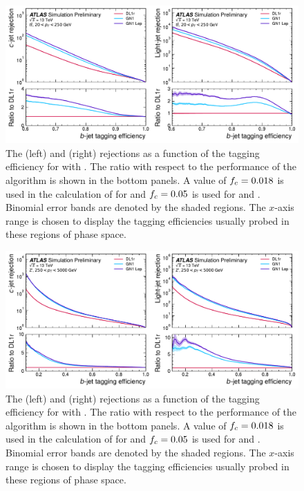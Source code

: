 \begin{figure}[!p]
    \centering
    \includegraphics[width=\textwidth]{chapters/gnn_tagger/figs/results/main/ttbar/ttbar_roc_btag.pdf}
    \caption{The \cjet (left) and \ljet (right) rejections as a function of the \bjet tagging efficiency for \ttbarjets with \ttbarpt \cite{ATL-PHYS-PUB-2022-027}.
             The ratio with respect to the performance of the \DLr algorithm is shown in the bottom panels.
             A value of $f_c = 0.018$ is used in the calculation of \Db for \DLr and $f_c = 0.05$ is used for \GNN and \GNNLep.
             Binomial error bands are denoted by the shaded regions.
             The $x$-axis range is chosen to display the \bjet tagging efficiencies usually probed in these regions of phase space.}
    \label{fig:ttbar_btag_roc}
\end{figure}

\begin{figure}[!p]
    \centering
    \includegraphics[width=\textwidth]{chapters/gnn_tagger/figs/results/main/zprime/zprime_roc_btag.pdf}
    \caption{The \cjet (left) and \ljet (right) rejections as a function of the \bjet tagging efficiency for \Zprimejets with \Zprimept \cite{ATL-PHYS-PUB-2022-027}.
             The ratio with respect to the performance of the \DLr algorithm is shown in the bottom panels.
             A value of $f_c = 0.018$ is used in the calculation of \Db for \DLr and $f_c = 0.05$ is used for \GNN and \GNNLep.
             Binomial error bands are denoted by the shaded regions.
             The $x$-axis range is chosen to display the \bjet tagging efficiencies usually probed in these regions of phase space.}
    \label{fig:zprime_btag_roc}
\end{figure}

